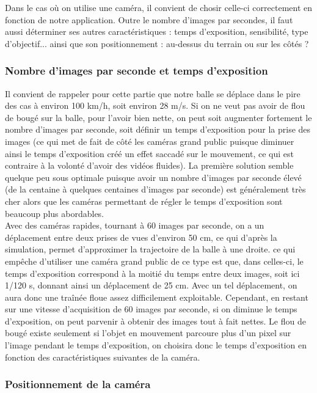 Dans le cas où on utilise une caméra, il convient de chosir celle-ci correctement en fonction de notre application. Outre le nombre d'images par secondes, il faut aussi déterminer ses autres caractéristiques : temps d'exposition, sensibilité, type d'objectif... ainsi que son positionnement : au-dessus du terrain ou sur les côtés ? 

\subsubsection{Nombre d'images par seconde et temps d'exposition}

Il convient de rappeler pour cette partie que notre balle se déplace dans le pire des cas à environ 100 km/h, soit environ 28 m/s. Si on ne veut pas avoir de flou de bougé sur la balle, pour l'avoir bien nette, on peut soit augmenter fortement le nombre d'images par seconde, soit définir un temps d'exposition pour la prise des images (ce qui met de fait de côté les caméras grand public puisque diminuer ainsi le temps d'exposition créé un effet saccadé sur le mouvement, ce qui est contraire à la volonté d'avoir des vidéos fluides). La première solution semble quelque peu sous optimale puisque avoir un nombre d'images par seconde élevé (de la centaine à quelques centaines d'images par seconde) est généralement très cher alors que les caméras permettant de régler le temps d'exposition sont beaucoup plus abordables. \\

Avec des caméras rapides, tournant à 60 images par seconde, on a un déplacement entre deux prises de vues d'environ 50 cm, ce qui d'après la simulation, permet d'approximer la trajectoire de la balle à une droite. ce qui empêche d'utiliser une caméra grand public de ce type est que, dans celles-ci, le temps d'exposition correspond à la moitié du temps entre deux images, soit ici 1/120 s, donnant ainsi un déplacement de 25 cm. Avec un tel déplacement, on aura donc une traînée floue assez difficilement exploitable. Cependant, en restant sur une vitesse d'acquisition de 60 images par seconde, si on diminue le temps d'exposition, on peut parvenir à obtenir des images tout à fait nettes. Le flou de bougé existe seulement si l'objet en mouvement parcoure plus d'un pixel sur l'image pendant le temps d'exposition, on choisira donc le temps d'exposition en fonction des caractéristiques suivantes de la caméra. 


\subsubsection{Positionnement de la caméra}

